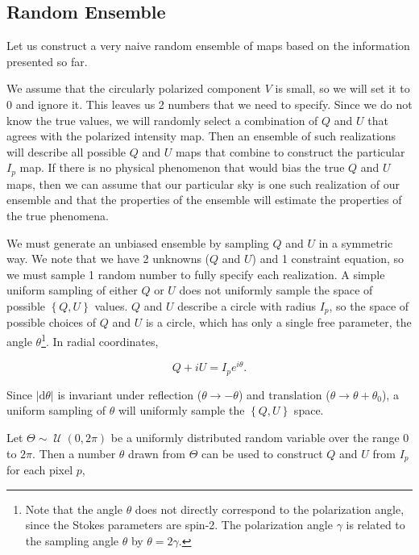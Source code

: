\documentclass[twoside,10pt]{article}
\DeclareMathOperator{\Uniform}{\mathcal{U}}
\newcommand{\abs}[1]{\lvert#1\rvert}
\newcommand{\pc}[1]{\left\{ #1 \right\} }
\newcommand{\dd}[0]{\mathrm{d}}
\begin{document}
\subsection{Random Ensemble}
\label{sub:random_ensemble}

Let us construct a very naive random ensemble of maps based on the information
presented so far.

We assume that the circularly polarized component $V$ is
small\cite{mainini_improved_2013}, so we will set it to 0 and ignore it. This
leaves us 2 numbers that we need to specify. Since we do not know the true
values, we will randomly select a combination of $Q$ and $U$ that agrees with
the polarized intensity map. Then an ensemble of such realizations will
describe all possible $Q$ and $U$ maps that combine to construct the
particular $I_p$ map. If there is no physical phenomenon that would bias the
true $Q$ and $U$ maps, then we can assume that our particular sky is one such
realization of our ensemble and that the properties of the ensemble will
estimate the properties of the true phenomena.

We must generate an unbiased ensemble by sampling $Q$ and $U$ in a symmetric
way. We note that we have 2 unknowns ($Q$ and $U$) and 1 constraint equation,
so we must sample 1 random number to fully specify each realization. A simple
uniform sampling of either $Q$ or $U$ does not uniformly sample the space of
possible $\pc{Q, U}$ values. $Q$ and $U$ describe a circle with radius $I_p$,
so the space of possible choices of $Q$ and $U$ is a circle, which has only a
single free parameter, the angle $\theta$\footnote{Note that the angle
$\theta$ does not directly correspond to the polarization angle, since the
Stokes parameters are spin-2. The polarization angle $\gamma$ is related to
the sampling angle $\theta$ by $\theta = 2\gamma$.}. In radial coordinates,

\begin{equation}
    Q + iU = I_p e^{i\theta}.
\end{equation}

Since $\abs{\dd\theta}$ is invariant under reflection
($\theta \to -\theta$) and translation ($\theta \to \theta + \theta_0$), a
uniform sampling of $\theta$ will uniformly sample the $\pc{Q, U}$ space.

Let $\Theta \sim \Uniform{(0, 2\pi)}$ be a uniformly distributed random
variable over the range 0 to $2\pi$. Then a number $\theta$ drawn from
$\Theta$ can be used to construct $Q$ and $U$ from $I_p$ for each pixel $p$,
\end{document}
